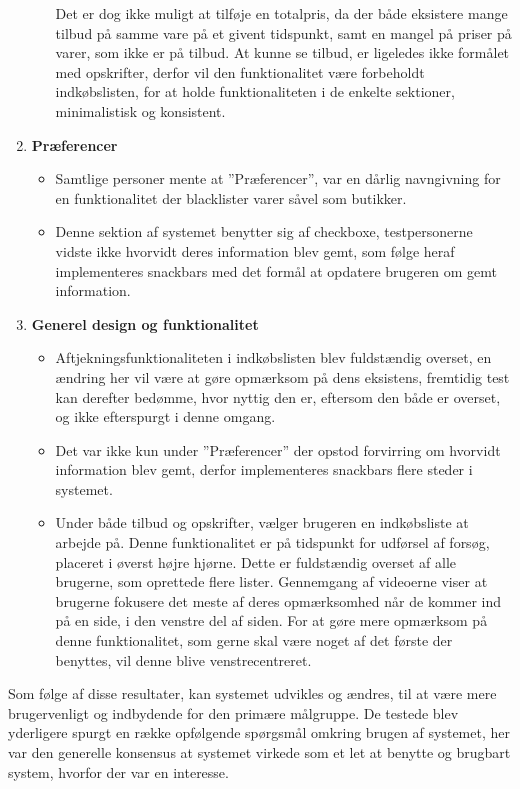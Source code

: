 \begin{enumerate}
\begin{itemize}
   								  Det er dog ikke muligt at tilføje en totalpris, da der både eksistere mange tilbud på samme vare på et givent tidspunkt, samt en mangel på priser på varer, som ikke er på tilbud.
   								  At kunne se tilbud, er ligeledes ikke formålet med opskrifter, derfor vil den funktionalitet være forbeholdt indkøbslisten, for at holde funktionaliteten i de enkelte sektioner, minimalistisk og konsistent.
   							   \end{itemize}
   \item \textbf{Præferencer}\begin{itemize}
   								  \item Samtlige personer mente at ''Præferencer'', var en dårlig navngivning for en funktionalitet der blacklister varer såvel som butikker.
   								  \item Denne sektion af systemet benytter sig af checkboxe, testpersonerne vidste ikke hvorvidt deres information blev gemt, som følge heraf implementeres snackbars med det formål at opdatere brugeren om gemt information.
   							   \end{itemize}
   \item \textbf{Generel design og funktionalitet}\begin{itemize}
   								  \item Aftjekningsfunktionaliteten i indkøbslisten blev fuldstændig overset, en ændring her vil være at gøre opmærksom på dens eksistens, fremtidig test kan derefter bedømme, hvor nyttig den er, eftersom den både er overset, og ikke efterspurgt i denne omgang.
   								  \item Det var ikke kun under ''Præferencer'' der opstod forvirring om hvorvidt information blev gemt, derfor implementeres snackbars flere steder i systemet.
   								  \item Under både tilbud og opskrifter, vælger brugeren en indkøbsliste at arbejde på.
   								  Denne funktionalitet er på tidspunkt for udførsel af forsøg, placeret i øverst højre hjørne.
   								  Dette er fuldstændig overset af alle brugerne, som oprettede flere lister.
   								  Gennemgang af videoerne viser at brugerne fokusere det meste af deres opmærksomhed når de kommer ind på en side, i den venstre del af siden.
   								  For at gøre mere opmærksom på denne funktionalitet, som gerne skal være noget af det første der benyttes, vil denne blive venstrecentreret.
   							   \end{itemize}
\end{enumerate}

Som følge af disse resultater, kan systemet udvikles og ændres, til at være mere brugervenligt og indbydende for den primære målgruppe.
De testede blev yderligere spurgt en række opfølgende spørgsmål omkring brugen af systemet, her var den generelle konsensus at systemet virkede som et let at benytte og brugbart system, hvorfor der var en interesse.
